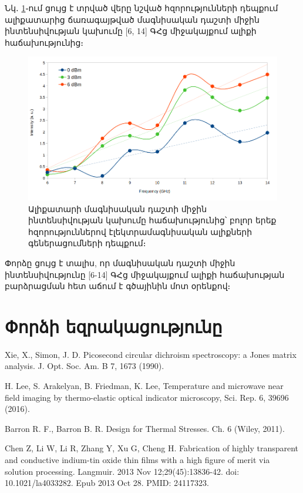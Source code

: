 \documentclass[12pt, fleqn]{report}
\begin{document}
Նկ․ \ref{fig:Int_vs_Freq_0_3_6_dBm}֊ում ցույց է տրված վերը նշված հզորությունների դեպքում ալիքատարից ճառագայթված մագնիսական դաշտի միջին ինտենսիվության կախումը [6, 14] ԳՀց միջակայքում ալիքի հաճախությունից։
\begin{figure}
    \centering
    \includegraphics[width=1.0\textwidth]{data/experiment-results/free_field_of_antenna_6-14GHz_0-6dBm_generator_output_distance_5mm.png}
    \caption{Ալիքատարի մագնիսական դաշտի միջին ինտենսիվության կախումը հաճախությունից՝ բոլոր երեք հզորություններով էլեկտրամագնիսական ալիքների գեներացումների դեպքում։}
    \label{fig:Int_vs_Freq_0_3_6_dBm}
\end{figure}
Փորձը ցույց է տալիս, որ մագնիսական դաշտի միջին ինտենսիվությունը [6-14] ԳՀց միջակայքում ալիքի հաճախության բարձրացման հետ աճում է գծայինին մոտ օրենքով։

\newpage

\section{Փորձի եզրակացությունը}



\renewcommand{\bibname}{Գրականություն}
\begin{thebibliography}{9}
Xie, X., Simon, J. D. Picosecond circular dichroism spectroscopy: a Jones matrix
analysis. J. Opt. Soc. Am. B 7, 1673 (1990).

H. Lee, S. Arakelyan, B. Friedman, K. Lee, Temperature and microwave near field imaging by thermo-elastic optical indicator microscopy, Sci. Rep. 6, 39696 (2016).

 Barron R. F., Barron B. R. Design for Thermal Stresses. Ch. 6 (Wiley, 2011).

 Chen Z, Li W, Li R, Zhang Y, Xu G, Cheng H. Fabrication of highly transparent and conductive indium-tin oxide thin films with a high figure of merit via solution processing. Langmuir. 2013 Nov 12;29(45):13836-42. doi: 10.1021/la4033282. Epub 2013 Oct 28. PMID: 24117323.
\end{thebibliography}


   
\end{document}
